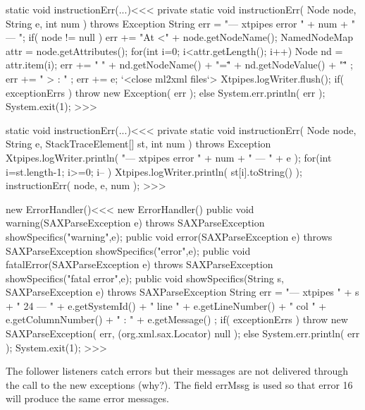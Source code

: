 \documentclass{article}
\begin{document}
\<static void instructionErr(...)\><<<
private static void instructionErr( Node node, String e, int num )
                                     throws Exception {
   String err = "--- xtpipes error " + num + " --- ";
   if( node != null ){
      err += "At <" + node.getNodeName(); 
      NamedNodeMap attr = node.getAttributes();
      for(int i=0; i<attr.getLength(); i++){
         Node nd = attr.item(i);
         err += " " +
             nd.getNodeName()  + "=\"" + 
             nd.getNodeValue() + "\"" ;
      }
      err += " > : " ; 
   }
   err += e;
   `<close ml2xml files`>
   Xtpipes.logWriter.flush();
   if( exceptionErrs ) { throw new Exception( err );  }   
   else { 
      System.err.println( err );
      System.exit(1); 
   }
}
>>>



\<static void instructionErr(...)\><<<
private static void instructionErr( Node node, String e,
                                StackTraceElement[] st, int num )
                                     throws Exception {
   Xtpipes.logWriter.println(
      "--- xtpipes error " + num + " --- " + e
   );
   for(int i=st.length-1; i>=0; i-- ){ 
      Xtpipes.logWriter.println( st[i].toString() ); 
   } 
   instructionErr( node, e, num );
}
>>>




\<new ErrorHandler()\><<<
new ErrorHandler() {
    public void warning(SAXParseException e) throws SAXParseException {
      showSpecifics("warning",e);
    }
    public void error(SAXParseException e) throws SAXParseException {
      showSpecifics("error",e);
    }
    public void fatalError(SAXParseException e) throws SAXParseException {
      showSpecifics("fatal error",e);
    }
    public void showSpecifics(String s, SAXParseException e)
                                                throws SAXParseException {
      String err =   "--- xtpipes " + s + " 24 --- " + e.getSystemId()
                     + " line " + e.getLineNumber()
                     + " col "  + e.getColumnNumber()
                     + " : "    + e.getMessage() ;
      if( exceptionErrs ) { throw new SAXParseException( 
                                     err, (org.xml.sax.Locator) null ); }
      else { 
         System.err.println( err );
         System.exit(1); 
}   } }
>>>





The follower listeners catch errors but their messages are not
delivered through the call to the new exceptions (why?).  The field
errMssg is used so that error 16 will produce the same error messages.
\end{document}
